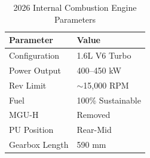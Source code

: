 \begin{table}[h]
\centering
\caption{2026 Internal Combustion Engine Parameters}
\vspace{0.2cm}
\begin{tabularx}{\textwidth}{@{}XX@{}}
\toprule
\textbf{Parameter} & \textbf{Value} \\
\midrule
Configuration & 1.6L V6 Turbo \\
Power Output & 400--450 kW \\
Rev Limit & $\sim$15,000 RPM \\
Fuel & 100\% Sustainable \\
MGU-H & Removed \\
PU Position & Rear-Mid \\
Gearbox Length & 590 mm \\
\bottomrule
\end{tabularx}
\label{tab:ice_params}
\end{table}

